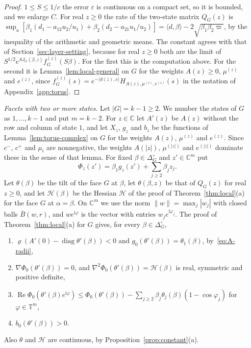 \begin{proof}
$1\le S\le1/c$ the error $\varepsilon$ is continuous on a compact set, so it is bounded, and we
enlarge $C$. For real $z\ge0$ the
rate of the two-state matrix $Q_G(z)$ is
$\sup_u[\beta_1(d_1-a_{12}u_2/u_1)+\beta_2(d_2-a_{21}u_1/u_2)]=\langle d,\beta\rangle-2\sqrt{\beta_1\beta_2\varpi}$,
by the inequality of the arithmetic and geometric means. The constant agrees with that of
Section~\ref{sec:layer-setting}, because for real $z\ge0$ both are the limit of
$S^{1/2}e^{SJ_G(\beta,z)}f^{(z)}_G(S\beta)$. For the first this is the computation above. For the
second it is Lemma~\ref{lem:local-general} on $G$ for the weights $A(z)\ge0$, $\mu^{(z)}$ and
$e^{(z)}$, since $f^{(z)}_G(s)=e^{-\langle d(z),s\rangle}H_{A(z),\mu^{(z)},e^{(z)}}(s)$ in the
notation of Appendix~\ref{app:torus}.
\end{proof}

\emph{Facets with two or more states.} Let $|G|=k-1\ge2$. We number the states of $G$ as
$1,\dots,k-1$ and put $m=k-2$. For $z\in\mathbb C$ let $A'(z)$ be $A(z)$ without the row and
column of state $1$, and let $X_z$, $g_z$ and $b_z$ be the functions of
Lemma~\ref{lem:torus-complex} on $G$ for the weights $A(z)$, $\mu^{(z)}$ and $e^{(z)}$. Since
$c^-$, $c^+$ and $\mu_i$ are nonnegative, the weights $A(|z|)$, $\mu^{(|z|)}$ and $e^{(|z|)}$
dominate these in the sense of that lemma. For fixed $\beta\in\Delta_G^\circ$ and
$z'\in\mathbb C^m$ put
\[
\Phi_z(z')=\beta_1g_z(z')+\sum_{j\ge2}\beta_jz_j .
\]
Let $\theta(\beta)$ be the tilt of the face $G$ at $\beta$, let $\theta(\beta,z)$ be that of
$Q_G(z)$ for real $z\ge0$, and let $\mathcal H(\beta)$ be the Hessian $\mathcal H$ of the proof of
Theorem~\ref{thm:local}(a) for the face $G$ at $\alpha=\beta$. On $\mathbb C^m$ we use the norm
$\lVert w\rVert=\max_j|w_j|$ with closed balls $\bar B(w,r)$, and $we^{\mathrm i\varphi}$ is the
vector with entries $w_je^{\mathrm i\varphi_j}$. The proof of Theorem~\ref{thm:local}(a) for $G$
gives, for every $\beta\in\Delta_G^\circ$,
\begin{enumerate}[label=(P\arabic*)]
\item $\varrho(A'(0)-\operatorname{diag}\theta'(\beta))<0$ and $g_0(\theta'(\beta))=\theta_1(\beta)$,
by~\eqref{eq:A-radii},
\item $\nabla\Phi_0(\theta'(\beta))=0$, and $\nabla^2\Phi_0(\theta'(\beta))=\mathcal H(\beta)$ is
real, symmetric and positive definite,
\item $\operatorname{Re}\Phi_0(\theta'(\beta)e^{\mathrm i\varphi})\le\Phi_0(\theta'(\beta))
-\sum_{j\ge2}\beta_j\theta_j(\beta)(1-\cos\varphi_j)$ for $\varphi\in\mathbb T^m$,
\item $b_0(\theta'(\beta))>0$.
\end{enumerate}
Also $\theta$ and $\mathcal H$ are continuous, by Proposition~\ref{prop:constant}(a).

